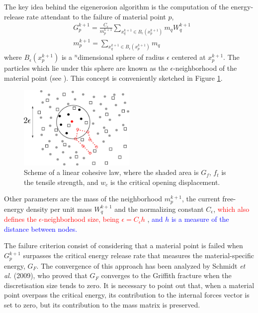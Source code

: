 \documentclass[preprint,12pt,a4paper]{elsarticle}
\newcommand{\PNA}[1]{
  \textcolor{red}{{#1}}
}
\newcommand{\MMP}[1]{
  \textcolor{blue}{{#1}}
}
\begin{document}
The key idea behind the eigenerosion algorithm is the computation of the
energy-release rate attendant to the failure of material point $p$,
\begin{align}
  \label{eq:energy-release-EE}
&G_p^{k+1} = \frac{C_{\epsilon}}{m_p^{k+1}}  \sum_{x_q^{k+1} \in
  B_{\epsilon}(x_p^{k+1})} m_q W_q^{k+1}\\
  \label{eq:mass-EE}
&m_p^{k+1} =  \sum_{x_q^{k+1} \in
  B_{\epsilon}(x_p^{k+1})} m_q  
\end{align}
where $B_{\epsilon}(x_p^{k+1})$ is a $^n$dimensional sphere of radius $\epsilon$
centered at $x_p^{k+1}$. The particles which lie under this sphere are
known as the $\epsilon$-neighborhood of the material point (see
\cite{Pandolfi_2012}). This concept is conveniently sketched in
Figure \ref{fig:Failed-particles}.
\begin{figure}
  \centering
  \includegraphics[width=0.5\textwidth]{Figure-Particle-failed}
  \caption{Scheme of a linear cohesive law, where the shaded area is
    $G_f$, $f_t$ is the tensile strength, and $w_c$ is the critical
    opening displacement.}
  \label{fig:Failed-particles}
\end{figure}
Other parameters are the mass of the neighborhood $m_p^{k+1}$, the
current free-energy density per unit mass  $W_q^{k+1}$ and the
normalizing constant $C_{\epsilon}$, \PNA{which also defines the
  $\epsilon$-neighborhood size, being $\epsilon = C_\epsilon h$}, \MMP{ and
  $h$ is a measure of the distance between nodes.}

The failure criterion consist of considering that a material point is failed
when $G_p^{k+1}$ surpasses the critical energy release rate that
measures the material-specific energy, $G_F$. The convergence of this
approach has been analyzed by Schmidt {\it et al.}
(2009)\cite{Schmidt_2009}, who proved that $G_F$ converges to the Griffith
fracture when the discretisation size tends to zero. It is necessary to
point out that, when a material point overpass the critical energy, its
contribution to the internal forces vector is set to zero, but its
contribution to the mass matrix is preserved.\\
\end{document}
